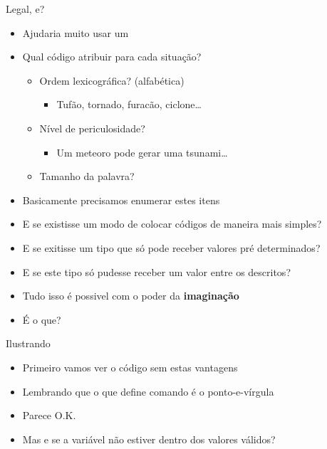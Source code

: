 \documentclass[14pt]{beamer}
\begin{document}
		\begin{frame}{Legal, e?}
			\begin{itemize}
				\presentationPause\item Ajudaria muito usar um 
				\presentationPause\item Qual código atribuir para cada situação?
				\begin{itemize}
					\presentationPause\item Ordem lexicográfica? \presentationPause(alfabética)
					\begin{itemize}
						\presentationPause\item Tufão, tornado, furacão, ciclone\dots
					\end{itemize}
					\presentationPause\item Nível de periculosidade?
					\begin{itemize}
						\presentationPause\item Um meteoro pode gerar uma tsunami\dots
					\end{itemize}
					\presentationPause\item Tamanho da palavra?
				\end{itemize}
				\presentationPause\item Basicamente precisamos enumerar estes itens
				\presentationPause\item E se existisse um modo de colocar códigos de maneira mais simples?
				\presentationPause\item E se exitisse um tipo que só pode receber valores pré determinados?
				\presentationPause\item E se este tipo só pudesse receber um valor entre os descritos?
				\presentationPause\item Tudo isso é possivel \presentationPause com o poder da \textbf{{\color{slideBlue}i}{\color{slideCyan}m}{\color{slideTurquoise}a}{\color{slideGreen}g}{\color{slideYellow}i}{\color{slideOrange}n}{\color{slideRed}a}{\color{slidePurple}ç}{\color{slideBlue}ã}{\color{slideCyan}o}}
				\presentationPause\item É o que?
			\end{itemize}
		\end{frame}

		\begin{frame}{Ilustrando}
			\begin{itemize}
				\presentationPause\item Primeiro vamos ver o código sem estas vantagens
				\presentationPause\item Lembrando que o que define comando é o ponto-e-vírgula
			\end{itemize}
			\presentationPause
			\begin{itemize}
				\presentationPause\item Parece O.K.
				\presentationPause\item Mas e se a variável não estiver dentro dos valores válidos?
			\end{itemize}
		\end{frame}
\end{document}
